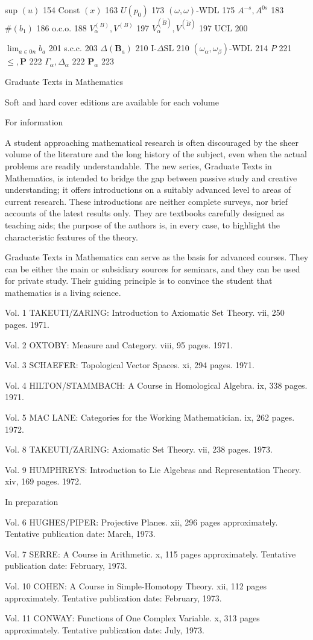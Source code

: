 sup $(u)$ 154
Const $(x)$ 163
$U(p_0)$ 173
$(\omega, \omega)$-WDL 175
$A^{-s}, A^{0s}$ 183
$\#(b_1)$ 186
o.c.o. 188
$V_{\alpha}^{(B)}, V^{(B)}$ 197
$V_{\alpha}^{(\tilde{B})}, V^{(\tilde{B})}$ 197
UCL 200

$\lim_{a \in 0n} b_a$ 201
s.c.c. 203
$\Delta(\mathbf{B}_a)$ 210
I-$\Delta$SL 210
$(\omega_\alpha, \omega_\beta)$-WDL 214
$P$ 221
$\leq, \mathbf{P}$ 222
$\Gamma_\alpha, \Delta_\alpha$ 222
$\mathbf{P}_\alpha$ 223

Graduate Texts in Mathematics

Soft and hard cover editions are available for each volume

For information

A student approaching mathematical research is often discouraged by the sheer volume of the literature and the long history of the subject, even when the actual problems are readily understandable. The new series, Graduate Texts in Mathematics, is intended to bridge the gap between passive study and creative understanding; it offers introductions on a suitably advanced level to areas of current research. These introductions are neither complete surveys, nor brief accounts of the latest results only. They are textbooks carefully designed as teaching aids; the purpose of the authors is, in every case, to highlight the characteristic features of the theory.

Graduate Texts in Mathematics can serve as the basis for advanced courses. They can be either the main or subsidiary sources for seminars, and they can be used for private study. Their guiding principle is to convince the student that mathematics is a living science.

Vol. 1 TAKEUTI/ZARING: Introduction to Axiomatic Set Theory. vii, 250 pages. 1971.

Vol. 2 OXTOBY: Measure and Category. viii, 95 pages. 1971.

Vol. 3 SCHAEFER: Topological Vector Spaces. xi, 294 pages. 1971.

Vol. 4 HILTON/STAMMBACH: A Course in Homological Algebra. ix, 338 pages. 1971.

Vol. 5 MAC LANE: Categories for the Working Mathematician. ix, 262 pages. 1972.

Vol. 8 TAKEUTI/ZARING: Axiomatic Set Theory. vii, 238 pages. 1973.

Vol. 9 HUMPHREYS: Introduction to Lie Algebras and Representation Theory. xiv, 169 pages. 1972.

In preparation

Vol. 6 HUGHES/PIPER: Projective Planes. xii, 296 pages approximately. Tentative publication date: March, 1973.

Vol. 7 SERRE: A Course in Arithmetic. x, 115 pages approximately. Tentative publication date: February, 1973.

Vol. 10 COHEN: A Course in Simple-Homotopy Theory. xii, 112 pages approximately. Tentative publication date: February, 1973.

Vol. 11 CONWAY: Functions of One Complex Variable. x, 313 pages approximately. Tentative publication date: July, 1973.
